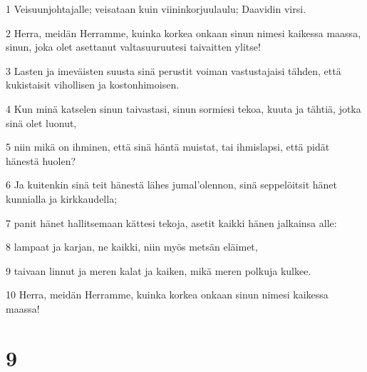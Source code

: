 \par 1 Veisuunjohtajalle; veisataan kuin viininkorjuulaulu; Daavidin virsi.
\par 2 Herra, meidän Herramme, kuinka korkea onkaan sinun nimesi kaikessa maassa, sinun, joka olet asettanut valtasuuruutesi taivaitten ylitse!
\par 3 Lasten ja imeväisten suusta sinä perustit voiman vastustajaisi tähden, että kukistaisit vihollisen ja kostonhimoisen.
\par 4 Kun minä katselen sinun taivastasi, sinun sormiesi tekoa, kuuta ja tähtiä, jotka sinä olet luonut,
\par 5 niin mikä on ihminen, että sinä häntä muistat, tai ihmislapsi, että pidät hänestä huolen?
\par 6 Ja kuitenkin sinä teit hänestä lähes jumal'olennon, sinä seppelöitsit hänet kunnialla ja kirkkaudella;
\par 7 panit hänet hallitsemaan kättesi tekoja, asetit kaikki hänen jalkainsa alle:
\par 8 lampaat ja karjan, ne kaikki, niin myös metsän eläimet,
\par 9 taivaan linnut ja meren kalat ja kaiken, mikä meren polkuja kulkee.
\par 10 Herra, meidän Herramme, kuinka korkea onkaan sinun nimesi kaikessa maassa!

\chapter{9}

